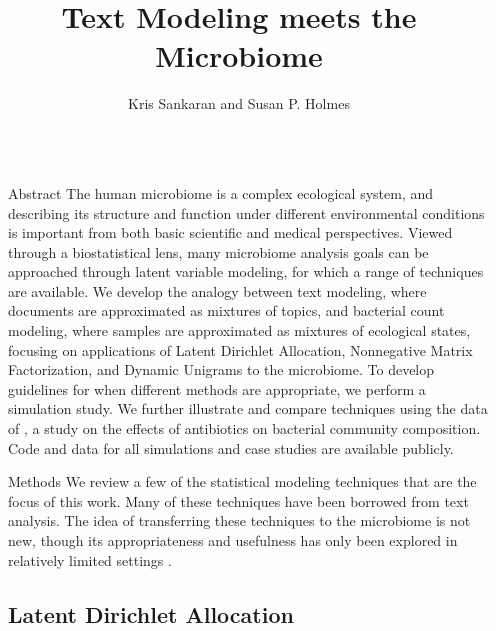 \documentclass[final]{beamer}
\title{Text Modeling meets the Microbiome}
\author{Kris Sankaran and Susan P. Holmes}
\institute{Department of Statistics, Stanford University}
\newlength{\sepwid}
\newlength{\onecolwid}
\begin{document}

\begin{frame}

\begin{columns}

\begin{column}{\sepwid}\end{column}
\begin{column}{\onecolwid}

\begin{block}{Abstract}
The human microbiome is a complex ecological system, and describing its
structure and function under different environmental conditions is important
from both basic scientific and medical perspectives. Viewed through a
biostatistical lens, many microbiome analysis goals can be approached through
latent variable modeling, for which a range of techniques are available. We
develop the analogy between text modeling, where documents are approximated as
mixtures of topics, and bacterial count modeling, where samples are approximated
as mixtures of ecological states, focusing on applications of Latent Dirichlet
Allocation, Nonnegative Matrix Factorization, and Dynamic Unigrams to the
microbiome. To develop guidelines for when different methods are appropriate, we
perform a simulation study. We further illustrate and compare techniques using
the data of \citep{dethlefsen2011incomplete}, a study on the effects of
antibiotics on bacterial community composition. Code and data for all
simulations and case studies are available publicly.
\end{block}

\begin{block}{Methods}
We review a few of the statistical modeling techniques that are the focus of
this work. Many of these techniques have been borrowed from text analysis. The
idea of transferring these techniques to the microbiome is not new, though its
appropriateness and usefulness has only been explored in relatively limited
settings \citep{holmes2012dirichlet, chen2012estimating, chen2013variable,
  shafiei2015biomico}.

\subsection{Latent Dirichlet Allocation}
\label{subsec:latent_dirichlet_allocation}


\end{block}
\end{column}
\end{columns}
\end{frame}
\end{document}
